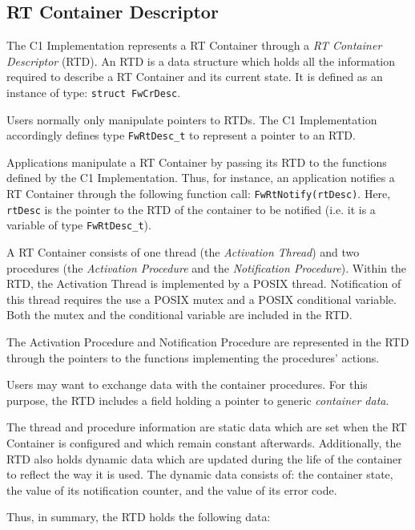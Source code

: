 \documentclass[manual]{../fwprofile}
\begin{document}
\subsection{RT Container Descriptor}\label{sec:rtDesc}
The C1 Implementation represents a RT Container through a \emph{RT Container Descriptor} (RTD). An RTD is a data structure which holds all the information required to describe a RT Container and its current state. It is defined as an instance of type: \texttt{struct FwCrDesc}.

Users normally only manipulate pointers to RTDs. The C1 Implementation accordingly defines type \texttt{FwRtDesc\_t} to represent a pointer to an RTD.

Applications manipulate a RT Container by passing its RTD to the functions defined by 
the C1 Implementation. Thus, for instance, an application notifies a RT Container through 
the following function call: \texttt{FwRtNotify(rtDesc)}. Here, \texttt{rtDesc} is the pointer to the RTD of the container to be notified (i.e. it is a variable of type \texttt{FwRtDesc\_t}). 

A RT Container consists of one thread (the \emph{Activation Thread}) and two procedures (the \emph{Activation Procedure} and the \emph{Notification Procedure}). Within the RTD, the Activation Thread is implemented by a POSIX thread. Notification of this thread requires the use a POSIX mutex and a POSIX conditional variable. Both the mutex and the conditional variable are included in the RTD. 

The Activation Procedure and Notification Procedure are represented in the RTD through the pointers to the functions implementing the procedures' actions.

Users may want to exchange data with the container procedures. For this purpose, the RTD includes a field holding a pointer to generic \emph{container data}.

The thread and procedure information are static data which are set when the RT Container is configured and which remain constant afterwards. Additionally, the RTD also holds dynamic data which are updated during the life of the container to reflect the way it is used. The dynamic data consists of: the container state, the value of its notification counter, and the value of its error code.

Thus, in summary, the RTD holds the following data:
\end{document}
